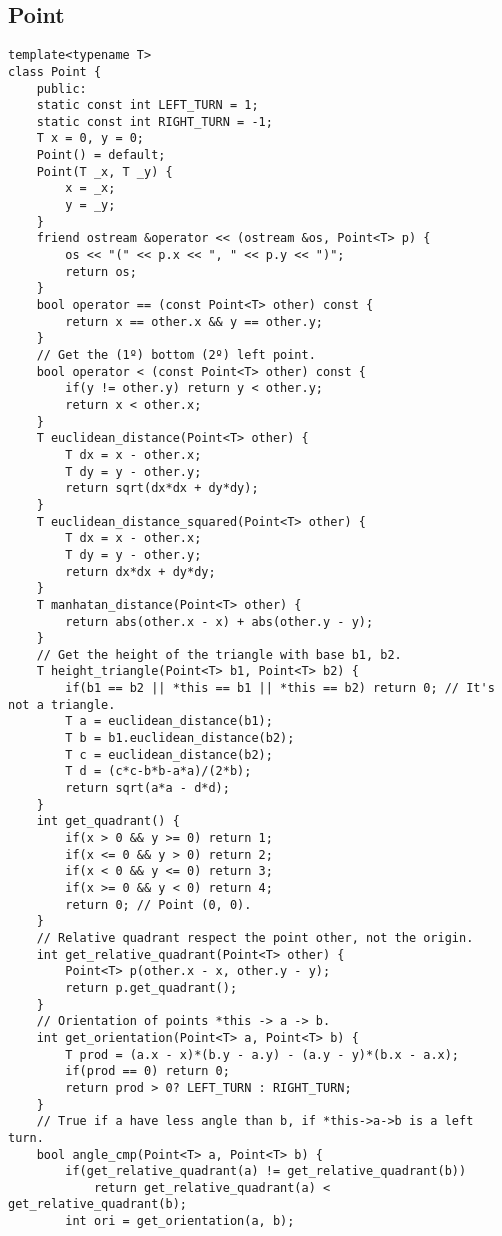 \documentclass[a4paper]{article}
\begin{document}
\subsection*{Point}
\begin{verbatim}
template<typename T>
class Point {
    public:
    static const int LEFT_TURN = 1;
    static const int RIGHT_TURN = -1;
    T x = 0, y = 0;
    Point() = default;
    Point(T _x, T _y) {
        x = _x;
        y = _y;
    }
    friend ostream &operator << (ostream &os, Point<T> p) {
        os << "(" << p.x << ", " << p.y << ")";
        return os;
    }
    bool operator == (const Point<T> other) const {
        return x == other.x && y == other.y;
    }
    // Get the (1º) bottom (2º) left point.
    bool operator < (const Point<T> other) const {
        if(y != other.y) return y < other.y;
        return x < other.x;
    }
    T euclidean_distance(Point<T> other) {
        T dx = x - other.x;
        T dy = y - other.y;
        return sqrt(dx*dx + dy*dy);
    }
    T euclidean_distance_squared(Point<T> other) {
        T dx = x - other.x;
        T dy = y - other.y;
        return dx*dx + dy*dy;
    }
    T manhatan_distance(Point<T> other) {
        return abs(other.x - x) + abs(other.y - y);
    }
    // Get the height of the triangle with base b1, b2.
    T height_triangle(Point<T> b1, Point<T> b2) {
        if(b1 == b2 || *this == b1 || *this == b2) return 0; // It's not a triangle.
        T a = euclidean_distance(b1);
        T b = b1.euclidean_distance(b2);
        T c = euclidean_distance(b2);
        T d = (c*c-b*b-a*a)/(2*b);
        return sqrt(a*a - d*d);
    }
    int get_quadrant() {
        if(x > 0 && y >= 0) return 1;
        if(x <= 0 && y > 0) return 2;
        if(x < 0 && y <= 0) return 3;
        if(x >= 0 && y < 0) return 4;
        return 0; // Point (0, 0).
    }
    // Relative quadrant respect the point other, not the origin.
    int get_relative_quadrant(Point<T> other) {
        Point<T> p(other.x - x, other.y - y);
        return p.get_quadrant();
    }
    // Orientation of points *this -> a -> b.
    int get_orientation(Point<T> a, Point<T> b) {
        T prod = (a.x - x)*(b.y - a.y) - (a.y - y)*(b.x - a.x);
        if(prod == 0) return 0;
        return prod > 0? LEFT_TURN : RIGHT_TURN;
    }
    // True if a have less angle than b, if *this->a->b is a left turn.
    bool angle_cmp(Point<T> a, Point<T> b) {
        if(get_relative_quadrant(a) != get_relative_quadrant(b)) 
            return get_relative_quadrant(a) < get_relative_quadrant(b);
        int ori = get_orientation(a, b);

\end{verbatim}
\end{document}
